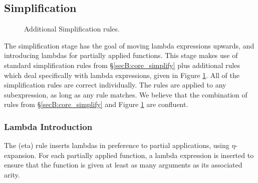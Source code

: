 \subsection{Simplification}
\label{secF:simplification_detail}

\begin{figure}
\begin{simplify}





\end{simplify}
\caption{Additional Simplification rules.}
\label{figF:lambda_simplify}
\end{figure}

The simplification stage has the goal of moving lambda expressions upwards, and introducing lambdas for partially applied functions. This stage makes use of standard simplification rules from \S\ref{secB:core_simplify} plus additional rules which deal specifically with lambda expressions, given in Figure \ref{figF:lambda_simplify}. All of the simplification rules are correct individually. The rules are applied to any subexpression, as long as any rule matches. We believe that the combination of rules from \S\ref{secB:core_simplify} and Figure \ref{figF:lambda_simplify} are confluent.

\subsubsection{Lambda Introduction}

The (eta) rule inserts lambdas in preference to partial applications, using $\eta$-expansion. For each partially applied function, a lambda expression is inserted to ensure that the function is given at least as many arguments as its associated arity.

